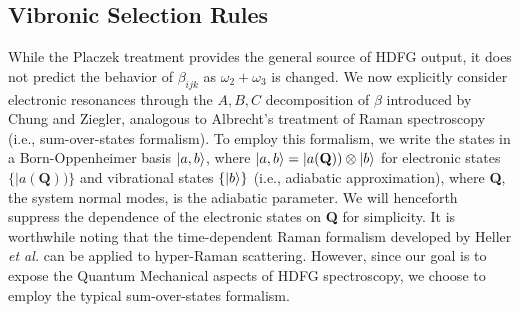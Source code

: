 \documentclass[aip, jcp, reprint, onecolumn, nofootinbib]{revtex4-2}
\begin{document}
\subsection{Vibronic Selection Rules}\label{Albrecht}
While the Placzek treatment provides the general source of HDFG output, it does not predict the behavior of $\beta_{ijk}$ as $\omega_2 + \omega_3$ is changed.
We now explicitly consider electronic resonances through the $A,B,C$ decomposition of $\beta$ introduced by Chung and Ziegler, analogous to Albrecht's treatment of Raman spectroscopy (i.e., sum-over-states formalism).\cite{Albrecht1961, Ziegler1988} 
To employ this formalism, we write the states in a Born-Oppenheimer basis $\ket{a,b}$, where $\ket{a,b} = |a(\textbf{Q})) \otimes \ket{b}$ for electronic states $\{|a(\textbf{Q}))\}$ and vibrational states $\{\ket{b}\}$ (i.e., adiabatic approximation), where \textbf{Q}, the system normal modes, is the adiabatic parameter. \cite{BornOppenheimer, Tang1970}
We will henceforth suppress the dependence of the electronic states on \textbf{Q} for simplicity.
It is worthwhile noting that the time-dependent Raman formalism developed by Heller \textit{et al.} can be applied to hyper-Raman scattering. \cite{Lee1979, Silverstein2012}
However, since our goal is to expose the Quantum Mechanical aspects of HDFG spectroscopy, we choose to employ the typical sum-over-states formalism.
\end{document}

